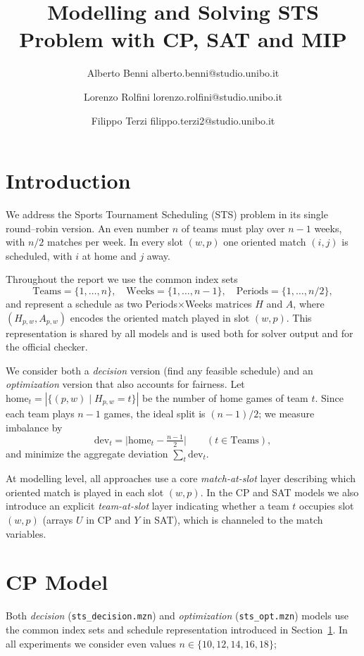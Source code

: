 \documentclass{article}
\title{Modelling and Solving STS Problem with CP, SAT and MIP}
\author{Alberto Benni alberto.benni@studio.unibo.it \and Lorenzo Rolfini lorenzo.rolfini@studio.unibo.it \and Filippo Terzi filippo.terzi2@studio.unibo.it}
\date{}
\begin{document}
\maketitle

\section{Introduction}
\label{sec:intro}

We address the Sports Tournament Scheduling (STS) problem in its single
round--robin version. An even number $n$ of teams must play over $n-1$ weeks,
with $n/2$ matches per week. In every slot $(w,p)$ one oriented match
$(i,j)$ is scheduled, with $i$ at home and $j$ away.

Throughout the report we use the common index sets
\[
  \text{Teams} = \{1,\dots,n\},\quad
  \text{Weeks} = \{1,\dots,n-1\},\quad
  \text{Periods} = \{1,\dots,n/2\},
\]
and represent a schedule as two Periods$\times$Weeks matrices $H$ and $A$,
where $(H_{p,w},A_{p,w})$ encodes the oriented match played in slot $(w,p)$.
This representation is shared by all models and is used both for solver output
and for the official checker.

We consider both a \emph{decision} version (find any feasible schedule) and an
\emph{optimization} version that also accounts for fairness. Let
$\mathrm{home}_t = |\{(p,w)\mid H_{p,w}=t\}|$ be the number of home games of
team $t$. Since each team plays $n-1$ games, the ideal split is $(n-1)/2$;
we measure imbalance by
\[
  \mathrm{dev}_t = \bigl|\mathrm{home}_t - \tfrac{n-1}{2}\bigr|
  \qquad (t\in\text{Teams}),
\]
and minimize the aggregate deviation $\sum_t \mathrm{dev}_t$.

At modelling level, all approaches use a core \emph{match-at-slot} layer
describing which oriented match is played in each slot $(w,p)$. In the CP and
SAT models we also introduce an explicit \emph{team-at-slot} layer indicating
whether a team $t$ occupies slot $(w,p)$ (arrays $U$ in CP and $Y$ in SAT),
which is channeled to the match variables. 

\section{CP Model}
\label{sec:cp-model}

Both \emph{decision} (\texttt{sts\_decision.mzn}) and \emph{optimization}
(\texttt{sts\_opt.mzn}) models use the common index sets and schedule
representation introduced in Section~\ref{sec:intro}. 
In all experiments we consider even values
$n\in\{10,12,14,16,18\}$; 
\end{document}
